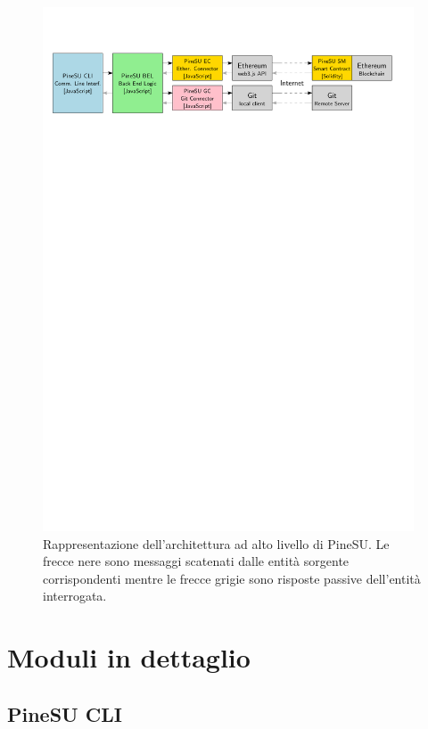 \begin{figure}[H]
    \centering
    \includegraphics[width=0.98\textwidth]{Figures/PineSU-architecture}
    \caption{\small{
    Rappresentazione dell'architettura ad alto livello di PineSU. 
    Le frecce nere sono messaggi scatenati dalle entità sorgente corrispondenti
    mentre le frecce grigie sono risposte passive dell'entità interrogata.
    } %
    } %
    \label{fi:arch}
\end{figure}
\newpage


\section{Moduli in dettaglio}
\subsection{PineSU CLI}


